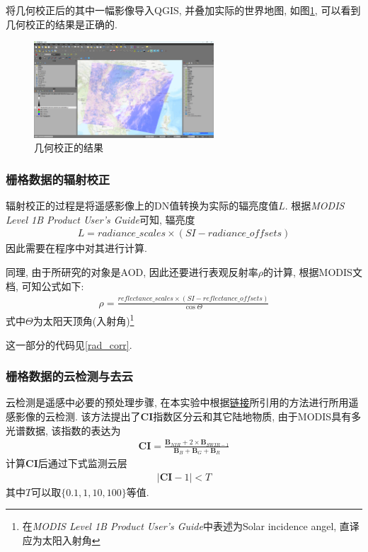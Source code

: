 \documentclass{ctexart}
\begin{document}
\begin{sloppypar}
将几何校正后的其中一幅影像导入QGIS, 并叠加实际的世界地图, 如图\ref{res_geom_corr}, 可以看到几何校正的结果是正确的.
\begin{figure}[h]
\centering
\includegraphics[width=0.6\textwidth]{./src/geom-corr.png}
\caption{几何校正的结果}\label{res_geom_corr}
\end{figure}
\subsubsection{栅格数据的辐射校正}\label{2-2-3}
辐射校正的过程是将遥感影像上的DN值转换为实际的辐亮度值$L$.
根据\textit{MODIS Level 1B Product User's Guide}可知, 辐亮度
\begin{align}
L=radiance\_scales \times \left( SI-radiance\_offsets\right)
\end{align}
因此需要在程序中对其进行计算.

同理, 由于所研究的对象是AOD, 因此还要进行表观反射率$\rho$的计算, 根据MODIS文档, 可知公式如下:
\begin{align}
\rho=\frac{reflectance\_scales \times (SI-reflectance\_offsets)}{\cos \Theta}
\end{align}
式中$\Theta$为太阳天顶角(入射角)\footnote{在\textit{MODIS Level 1B Product User's Guide}中表述为Solar incidence angel, 直译应为太阳入射角}

这一部分的代码见\ref{rad_corr}.


\subsubsection{栅格数据的云检测与去云}
云检测是遥感中必要的预处理步骤,
在本实验中根据\href{https://blog.csdn.net/ssshyeong/article/details/125947734}{\color{blue}链接}所引用的方法进行所用遥感影像的云检测. 
该方法提出了\textbf{CI}指数区分云和其它陆地物质, 由于MODIS具有多光谱数据, 该指数的表达为\cite{ZhaiZhang-707}
\begin{align}
\mathbf{CI}=\frac{\mathbf{B}_{NIR}+2\times \mathbf{B}_{SWIR-1}}{\mathbf{B}_B+\mathbf{B}_G+\mathbf{B}_R}
\end{align}
计算\textbf{CI}后通过下式监测云层
\begin{align}
\left|\mathbf{CI}-1\right|<T
\end{align}
其中$T$可以取$\{0.1,1,10,100\}$等值.


\end{sloppypar}
\end{document}
